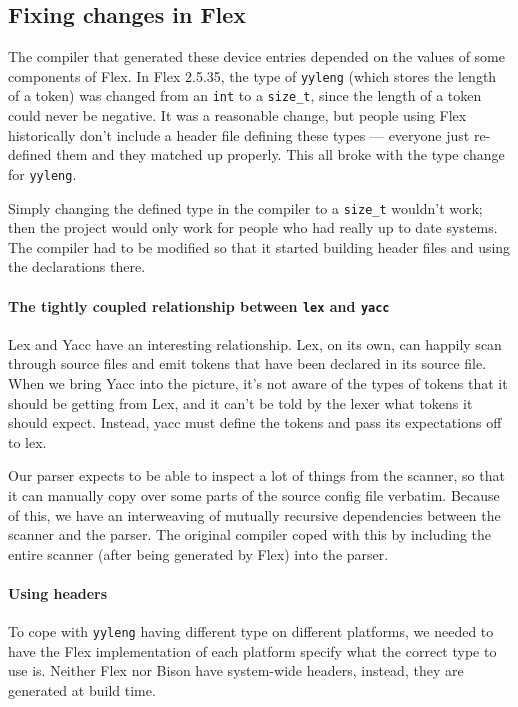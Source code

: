 \documentclass[12pt]{article}
\newcommand{\code}[1]{{\tt #1}}
\begin{document}
\subsection{Fixing changes in Flex}

The compiler that generated these device entries depended on the values of some
components of Flex.  In Flex 2.5.35, the type of \code{yyleng} (which stores
the length of a token) was changed from an \code{int} to a \code{size\_t},
since the length of a token could never be negative.  It was a reasonable
change, but people using Flex historically don't include a header file defining
these types \---- everyone just re-defined them and they matched up properly.
This all broke with the type change for \code{yyleng}.

Simply changing the defined type in the compiler to a \code{size\_t} wouldn't
work; then the project would only work for people who had really up to date
systems. The compiler had to be modified so that it started building header
files and using the declarations there.

\paragraph{The tightly coupled relationship between \code{lex} and \code{yacc}}
Lex and Yacc have an interesting relationship. Lex, on its own, can happily
scan through source files and emit tokens that have been declared in its source
file. When we bring Yacc into the picture, it's not aware of the types of
tokens that it should be getting from Lex, and it can't be told by the lexer
what tokens it should expect. Instead, yacc must define the tokens and pass
its expectations off to lex.

Our parser expects to be able to inspect a lot of things from the scanner, so
that it can manually copy over some parts of the source config file verbatim.
Because of this, we have an interweaving of mutually recursive dependencies
between the scanner and the parser. The original compiler coped with this by
including the entire scanner (after being generated by Flex) into the parser.

\paragraph{Using headers}
To cope with \code{yyleng} having different type on different platforms, we
needed to have the Flex implementation of each platform specify what the
correct type to use is. Neither Flex nor Bison have system-wide headers,
instead, they are generated at build time.
\end{document}
